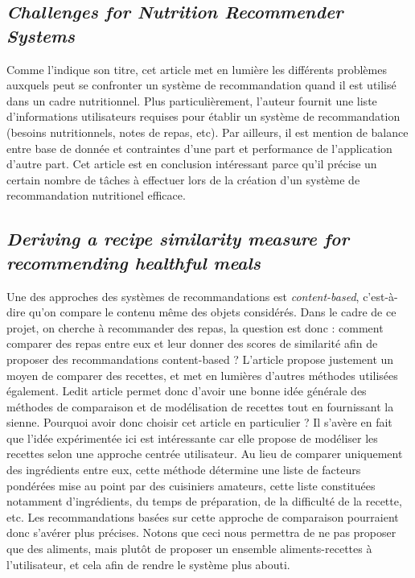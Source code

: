 \documentclass[a4paper, 11pt]{article}
\begin{document}
\subsection{\textit{Challenges for Nutrition Recommender Systems} \cite{challenges}}

Comme l'indique son titre, cet article met en lumière les différents problèmes auxquels peut se confronter un système de recommandation quand il est utilisé dans un cadre nutritionnel. Plus particulièrement, l'auteur fournit une liste d'informations utilisateurs requises pour établir un système de recommandation (besoins nutritionnels, notes de repas, etc). Par ailleurs, il est mention de balance entre base de donnée et contraintes d'une part et performance de l'application d'autre part. Cet article est en conclusion intéressant parce qu'il précise un certain nombre de tâches à effectuer lors de la création d'un système de recommandation nutritionel efficace.

\subsection{\textit{Deriving a recipe similarity measure for recommending healthful meals} \cite{recipesimilarity}}

Une des approches des systèmes de recommandations est \textit{content-based}, c'est-à-dire qu'on compare le contenu même des objets considérés. Dans le cadre de ce projet, on cherche à recommander des repas, la question est donc : comment comparer des repas entre eux et leur donner des scores de similarité afin de proposer des recommandations content-based ? 
L'article propose justement un moyen de comparer des recettes, et met en lumières d'autres méthodes utilisées également. Ledit article permet donc d'avoir une bonne idée générale des méthodes de comparaison et de modélisation de recettes tout en fournissant la sienne. Pourquoi avoir donc choisir cet article en particulier ? Il s'avère en fait que l'idée expérimentée ici est intéressante car elle propose de modéliser les recettes selon une approche centrée utilisateur. Au lieu de comparer uniquement des ingrédients entre eux, cette méthode détermine une liste de facteurs pondérées mise au point par des cuisiniers amateurs, cette liste constituées notamment d'ingrédients, du temps de préparation, de la difficulté de la recette, etc. Les recommandations basées sur cette approche de comparaison pourraient donc s'avérer plus précises. Notons que ceci nous permettra de ne pas proposer que des aliments, mais plutôt de proposer un ensemble aliments-recettes à l'utilisateur, et cela afin de rendre le système plus abouti.
\end{document}
